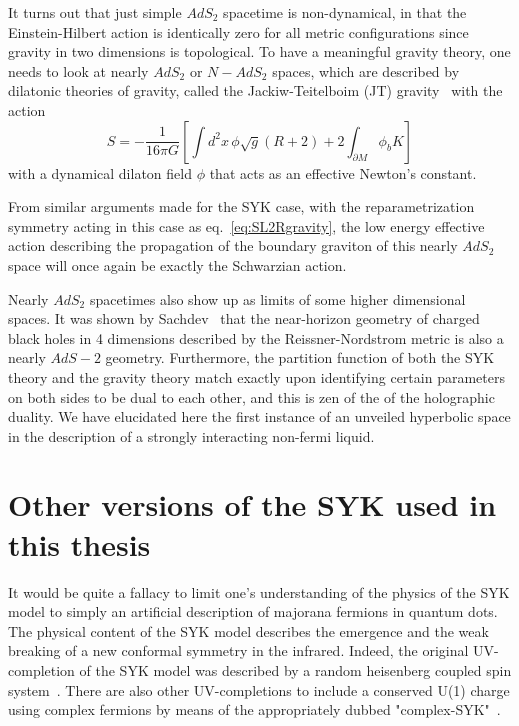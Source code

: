 \par
It turns out that just simple $AdS_2$ spacetime is non-dynamical, in that the Einstein-Hilbert action is identically zero for all metric configurations since gravity in two dimensions is topological. To have a meaningful gravity theory, one needs to look at nearly $AdS_2$ or $N-AdS_2$ spaces, which are described by dilatonic theories of gravity, called the Jackiw-Teitelboim (JT) gravity~\cite{almheiri2015models, sarosi2017ads} with the action 
\begin{equation}
    S = -\frac{1}{16\pi G}\left[\int d^2 x \, \phi\sqrt{g} (R + 2) + 2\int_{\partial M} \phi_b K\right] 
\end{equation}
with a dynamical dilaton field $\phi$ that acts as an effective Newton's constant. 

\par
From similar arguments made for the SYK case, with the reparametrization symmetry acting in this case as eq.~\eqref{eq:SL2Rgravity}, the low energy effective action describing the propagation of the boundary graviton of this nearly $AdS_2$ space will once again be exactly the Schwarzian action. 

\par
Nearly $AdS_2$ spacetimes also show up as limits of some higher dimensional spaces. It was shown by Sachdev~\cite{sachdev2015bekenstein} that the near-horizon geometry of charged black holes in 4 dimensions described by the Reissner-Nordstrom metric is also a nearly $AdS-2$ geometry. Furthermore, the partition function of both the SYK theory and the gravity theory match exactly upon identifying certain parameters on both sides to be dual to each other, and this is zen of the of the holographic duality. We have elucidated here the first instance of an unveiled hyperbolic space in the description of a strongly interacting non-fermi liquid. 


\section{Other versions of the SYK used in this thesis}
It would be quite a fallacy to limit one's understanding of the physics of the SYK model to simply an artificial description of majorana fermions in quantum dots. The physical content of the SYK model describes the emergence and the weak breaking of a new conformal symmetry in the infrared. Indeed, the original UV-completion of the SYK model was described by a random heisenberg coupled spin system~\cite{sachdev1993gapless}. There are also other UV-completions to include a conserved U(1) charge using complex fermions by means of the appropriately dubbed "complex-SYK"~\cite{sachdev2015bekenstein}. 

